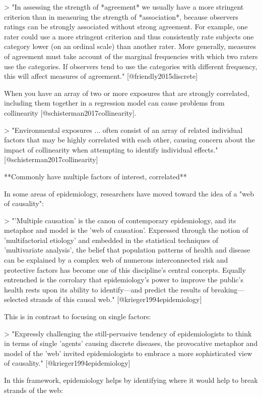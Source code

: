 > "In assessing the strength of *agreement* we usually have a more stringent
criterion than in measuring the strength of *association*, because observers
ratings can be strongly associated without strong agreement. For example, one
rater could use a more stringent criterion and thus consistently rate subjects
one category lower (on an ordinal scale) than another rater. More generally,
measures of agreement must take account of the marginal frequencies with which
two raters use the categories. If observers tend to use the categories with
different frequency, this will affect measures of agreement."
[@friendly2015discrete]

When you have an array of two or more exposures that are strongly correlated,
including them together in a regression model can cause problems from
collinearity [@schisterman2017collinearity].

> "Environmental exposures ... often consist of an array of related individual
factors that may be highly correlated with each other, causing concern about the
impact of collinearity when attempting to identify individual effects."
[@schisterman2017collinearity]

**Commonly have multiple factors of interest, correlated**

In some areas of epidemiology, researchers have moved toward the idea of a 
"web of causality": 

> "'Multiple causation' is the canon of contemporary epidemiology, and its
metaphor and model is the 'web of causation'. Expressed through the notion
of 'multifactorial etiology' and embedded in the statistical techniques
of 'multivariate analysis', the belief that population patterns of health 
and disease can be explained by a complex web of numerous interconnected 
risk and protective factors has become one of this discipline's central 
concepts. Equally entrenched is the corrolary that epidemiology's power
to improve the public's health rests upon its ability to identify---and predict
the results of breaking---selected strands of this causal web." [@krieger1994epidemiology]

This is in contrast to focusing on single factors: 

> "Expressly challenging the still-pervasive tendency of epidemiologists to
think in terms of single 'agents' causing discrete diseases, the provocative
metaphor and model of the 'web' invited epidemiologists to embrace a more
sophisticated view of causality." [@krieger1994epidemiology]

In this framework, epidemiology helps by identifying where it would help to
break strands of the web: 

